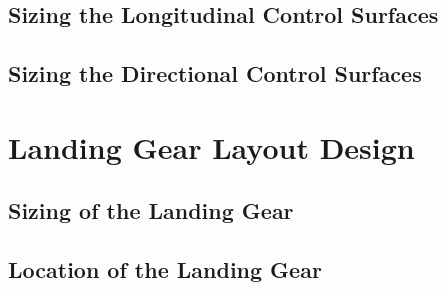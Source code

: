 \documentclass[conf]{new-aiaa}
\begin{document}
\subsection{Sizing the Longitudinal Control Surfaces}
\subsection{Sizing the Directional Control Surfaces}

\section{Landing Gear Layout Design}
\subsection{Sizing of the Landing Gear}
\subsection{Location of the Landing Gear}
\end{document}
